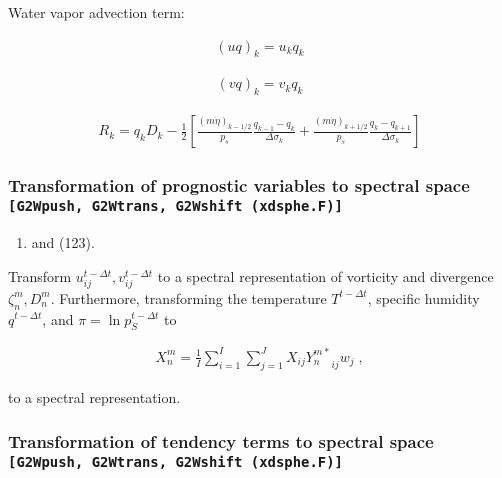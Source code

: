 Water vapor advection term:

\begin{eqnarray}
 (u q)_k  = u_k q_k
\end{eqnarray}

\begin{eqnarray}
 (v q)_k  = v_k q_k
\end{eqnarray}

\begin{eqnarray}
R_k  =  q_k D_k
       - \frac{1}{2}
             \left[   \frac{(m\dot{\eta})_{k-1/2}}{p_s} \frac{q_{k-1} - q_k}{\Delta\sigma_k}
               + \frac{(m\dot{\eta})_{k+1/2}}{p_s} \frac{q_k   - q_{k+1}}{\Delta\sigma_k} \right]
\end{eqnarray}

\hypertarget{transformation-of-prognostic-variables-to-spectral-space-g2wpush-g2wtrans-g2wshift-xdsphe.f}{%
\subsubsection{\texorpdfstring{Transformation of prognostic variables to
spectral space
\texttt{{[}G2Wpush,\ G2Wtrans,\ G2Wshift\ (xdsphe.F){]}}}{Transformation of prognostic variables to spectral space {[}G2Wpush, G2Wtrans, G2Wshift (xdsphe.F){]}}}\label{transformation-of-prognostic-variables-to-spectral-space-g2wpush-g2wtrans-g2wshift-xdsphe.f}}

\begin{enumerate}
\def\labelenumi{(\arabic{enumi})}
\setcounter{enumi}{121}
\tightlist
\item
  and (123).
\end{enumerate}

Transform \(u_{ij}^{t-\Delta t}, v_{ij}^{t-\Delta t}\) to a spectral
representation of vorticity and divergence \(\zeta_n^m, D_n^m\).
Furthermore, transforming the temperature \(T^{t-\Delta t}\), specific
humidity \(q^{t-\Delta t}\), and \(\pi = \ln p_S^{t-\Delta t}\) to

\begin{eqnarray}
  X_n^m  =  \frac{1}{I} \sum_{i=1}^{I} \sum_{j=1}^{J}  
               X_{ij} {Y_n^{m *}}_{ij}  w_j \; ,
\end{eqnarray}

to a spectral representation.

\hypertarget{transformation-of-tendency-terms-to-spectral-space-g2wpush-g2wtrans-g2wshift-xdsphe.f}{%
\subsubsection{\texorpdfstring{Transformation of tendency terms to
spectral space
\texttt{{[}G2Wpush,\ G2Wtrans,\ G2Wshift\ (xdsphe.F){]}}}{Transformation of tendency terms to spectral space {[}G2Wpush, G2Wtrans, G2Wshift (xdsphe.F){]}}}\label{transformation-of-tendency-terms-to-spectral-space-g2wpush-g2wtrans-g2wshift-xdsphe.f}}


